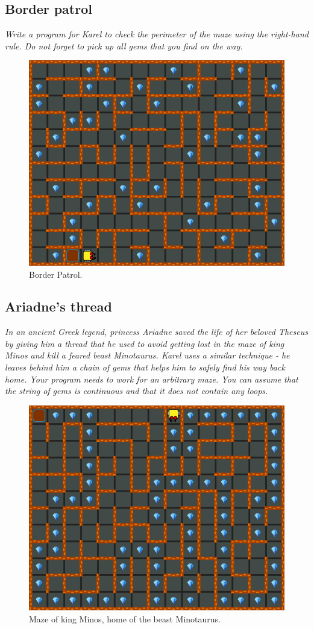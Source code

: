 {{\subsection{Border patrol}

{\em Write a program for Karel to check the perimeter of the maze using the 
right-hand rule. Do not forget to pick up all gems that you find on the way.}

\begin{figure}[!ht]
\begin{center}
\includegraphics[height=0.4\textwidth]{img/f13.png}
\end{center}
\vspace{-4mm}
\caption{Border Patrol.}
\label{fig:f13}
\end{figure}



\subsection{Ariadne's thread}

{\em In an ancient Greek legend, princess Ariadne saved the life of her 
beloved Theseus by giving him a thread that he used to avoid getting lost 
in the maze of king Minos and kill a feared beast Minotaurus. Karel uses 
a similar technique - he leaves behind him a chain of gems that helps him 
to safely find his way back home. Your program needs to work for an 
arbitrary maze. You can assume that the string of gems is continuous 
and that it does not contain any loops.}

\newpage

\begin{figure}[!ht]
\begin{center}
\includegraphics[height=0.4\textwidth]{img/f14.png}
\end{center}
\vspace{-4mm}
\caption{Maze of king Minos, home of the beast Minotaurus.}
\label{fig:f14}
\end{figure}

}}
